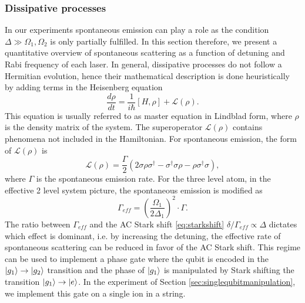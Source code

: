 \subsubsection{Dissipative processes}
\label{sec:dissipation}
In our experiments spontaneous emission can play a role as the condition $\Delta \gg \Omega_1,\Omega_2$ is only partially fulfilled. In this section therefore, we present a quantitative overview of spontaneous scattering as a function of detuning and Rabi frequency of each laser. In general, dissipative processes do not follow a Hermitian evolution, hence their mathematical description is done heuristically by adding terms in the Heisenberg equation
\begin{equation}
\label{masterequation}
\frac{d\rho}{dt} = \frac{1}{i\hbar}[H,\rho] + \mathcal{L}(\rho).
\end{equation}
This equation is usually referred to as master equation in Lindblad form, where $\rho$ is the density matrix of the system. The superoperator
$\mathcal{L}(\rho)$ contains phenomena not included in the Hamiltonian. For spontaneous emission, the form of $\mathcal{L}(\rho)$ is \cite{quantumnoise}
\begin{equation}
\mathcal{L}(\rho) = \frac{\Gamma}{2}(2\sigma \rho \sigma^\dagger -\sigma^\dagger\sigma \rho - \rho \sigma^\dagger \sigma),
\end{equation}
where $\Gamma$ is the spontaneous emission rate.
For the three level atom, in the effective 2 level system picture, the spontaneous emission is modified as \cite{russo}
\begin{equation}
\label{eq:gammaeff}
\Gamma_{eff} = \left(\frac{\Omega_1}{2 \Delta_1}\right)^2 \cdot \Gamma.
\end{equation}
The ratio between $\Gamma_{eff}$ and the AC Stark shift \eqref{eq:starkshift} $\delta/\Gamma_{eff}\propto \Delta$ dictates which effect is dominant, i.e. by increasing the detuning, the effective rate of spontaneous scattering can be reduced in favor of the AC Stark shift. This regime can be used to implement a phase gate where the qubit is encoded in the $\ket{g_1}\to\ket{g_2}$ transition and the phase of $\ket{g_1}$ is manipulated by Stark shifting the transition $\ket{g_1}\to \ket{e}$. In the experiment of Section \ref{sec:singlequbitmanipulation}, we implement this gate on a single ion in a string.


